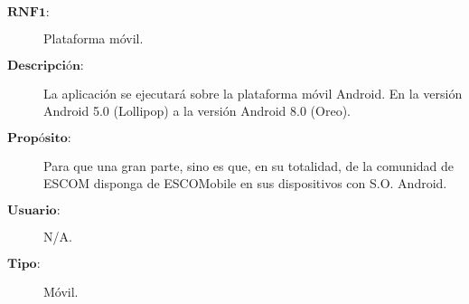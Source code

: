 \begin{description}

	\item[$\textbf{RNF1:}$] Plataforma móvil.
	\item[$\textbf{Descripción:}$] La aplicación se ejecutará sobre la plataforma móvil Android. En la versión Android 5.0 (Lollipop) a la versión Android 8.0 (Oreo).
	\item[$\textbf{Propósito:}$] Para que una gran parte, sino es que, en su totalidad, 
		de la comunidad de ESCOM disponga de ESCOMobile en sus dispositivos con S.O. Android.
	\item[$\textbf{Usuario:}$] N/A.
	\item[$\textbf{Tipo:}$] Móvil.	\\
		
\end{description}





